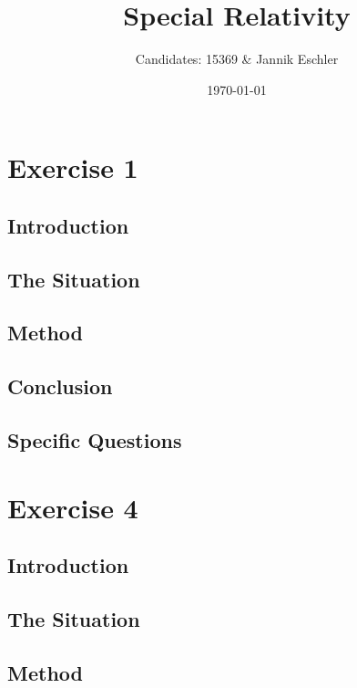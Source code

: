 \documentclass[reprint,english,notitlepage]{revtex4-2}
\begin{document}
\title{Special Relativity}
\author{Candidates: 15369 \& Jannik Eschler}
\date{\today}


\maketitle

\section{Exercise 1}

  \subsection{Introduction}

  \subsection{The Situation}

  \subsection{Method}

  \subsection{Conclusion} 

  \subsection{Specific Questions}


\section{Exercise 4}

  \subsection{Introduction}

  \subsection{The Situation}

  \subsection{Method}
\end{document}
